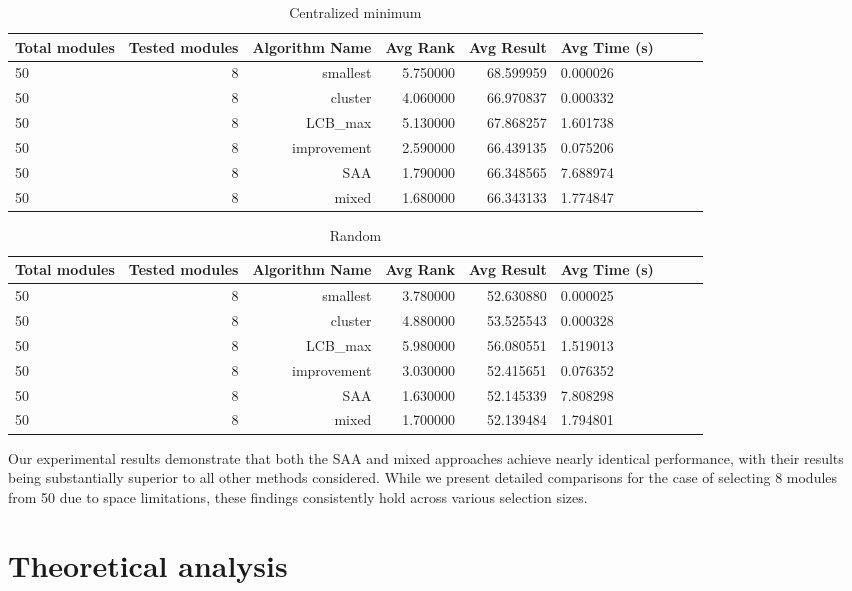 \documentclass[opre,sglanonrev]{informs4}
\begin{document}
\begin{table}[H]
\centering
\caption{Centralized minimum}
\begin{tabular}{lrrrrlrrr}
\toprule
Total modules & Tested modules & Algorithm Name & Avg Rank & Avg Result & Avg Time (s) \\
\midrule	
50 & 8 & smallest & 5.750000 & 68.599959 & 0.000026 \\
50 & 8 & cluster & 4.060000 & 66.970837 & 0.000332 \\
50 & 8 & LCB\_max & 5.130000 & 67.868257 & 1.601738 \\
50 & 8 & improvement & 2.590000 & 66.439135 & 0.075206 \\
50 & 8 & SAA & 1.790000 & 66.348565 & 7.688974 \\
50 & 8 & mixed & 1.680000 & 66.343133 & 1.774847 \\
\bottomrule
\end{tabular}
\end{table}

\begin{table}[H]
\centering
\caption{Random}
\begin{tabular}{lrrrrlrrr}
\toprule
Total modules & Tested modules & Algorithm Name & Avg Rank & Avg Result & Avg Time (s) \\
\midrule	
50 & 8 & smallest & 3.780000 & 52.630880 & 0.000025 \\
50 & 8 & cluster & 4.880000 & 53.525543 & 0.000328 \\
50 & 8 & LCB\_max & 5.980000 & 56.080551 & 1.519013 \\
50 & 8 & improvement & 3.030000 & 52.415651 & 0.076352 \\
50 & 8 & SAA & 1.630000 & 52.145339 & 7.808298 \\ 
50 & 8 & mixed & 1.700000 & 52.139484 & 1.794801 \\
\bottomrule
\end{tabular}
\end{table}
Our experimental results demonstrate that both the SAA and mixed approaches achieve nearly identical performance, with their results being substantially superior to all other methods considered. While we present detailed comparisons for the case of selecting 8 modules from 50 due to space limitations, these findings consistently hold across various selection sizes.

\clearpage
\section{Theoretical analysis}
\end{document}
